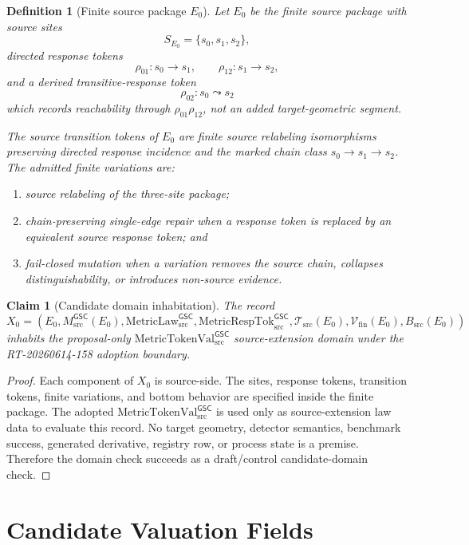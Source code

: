 \documentclass[11pt]{article}
\newcommand{\MsrcGSC}{M_{\mathrm{src}}^{\mathsf{GSC}}}
\newcommand{\MetricLaw}{\mathrm{MetricLaw}_{\mathrm{src}}^{\mathsf{GSC}}}
\newcommand{\MetricRespTok}{\mathrm{MetricRespTok}_{\mathrm{src}}^{\mathsf{GSC}}}
\newcommand{\MetricTokenVal}{\mathrm{MetricTokenVal}_{\mathrm{src}}^{\mathsf{GSC}}}
\newcommand{\Ezero}{E_{0}}
\newtheorem{definition}{Definition}
\newtheorem{claim}{Claim}
\begin{document}
\begin{definition}[Finite source package \(\Ezero\)]
Let \(\Ezero\) be the finite source package with source sites
\[
  S_{\Ezero}=\{s_0,s_1,s_2\},
\]
directed response tokens
\[
  \rho_{01}:s_0\to s_1,\qquad
  \rho_{12}:s_1\to s_2,
\]
and a derived transitive-response token
\[
  \rho_{02}:s_0\leadsto s_2
\]
which records reachability through \(\rho_{01}\rho_{12}\), not an added
target-geometric segment.

The source transition tokens of \(\Ezero\) are finite source relabeling
isomorphisms preserving directed response incidence and the marked chain
class \(s_0\to s_1\to s_2\). The admitted finite variations are:
\begin{enumerate}[leftmargin=*]
  \item source relabeling of the three-site package;
  \item chain-preserving single-edge repair when a response token is replaced
  by an equivalent source response token; and
  \item fail-closed mutation when a variation removes the source chain,
  collapses distinguishability, or introduces non-source evidence.
\end{enumerate}
\end{definition}

\begin{claim}[Candidate domain inhabitation]
The record
\[
  X_0=(\Ezero,\MsrcGSC(\Ezero),\MetricLaw,\MetricRespTok,
  \mathcal{T}_{\mathrm{src}}(\Ezero),
  \mathcal{V}_{\mathrm{fin}}(\Ezero),B_{\mathrm{src}}(\Ezero))
\]
inhabits the proposal-only \(\MetricTokenVal\) source-extension domain under
the RT-20260614-158 adoption boundary.
\end{claim}

\begin{proof}
Each component of \(X_0\) is source-side. The sites, response tokens,
transition tokens, finite variations, and bottom behavior are specified
inside the finite package. The adopted \(\MetricTokenVal\) is used only as
source-extension law data to evaluate this record. No target geometry,
detector semantics, benchmark success, generated derivative, registry row, or
process state is a premise. Therefore the domain check succeeds as a
draft/control candidate-domain check.
\end{proof}

\section{Candidate Valuation Fields}\label{candidate-valuation-fields}
\end{document}
